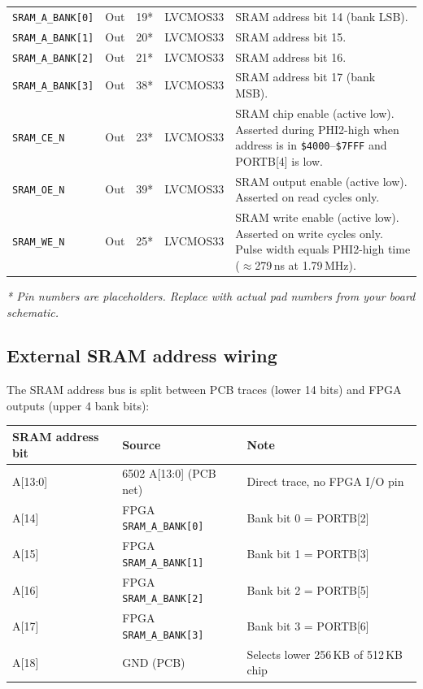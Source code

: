 \documentclass[11pt,a4paper]{article}
\newcommand{\sig}[1]{\texttt{#1}}
\newcommand{\hex}[1]{\texttt{\$#1}}
\begin{document}
\begin{center}
\begin{longtable}{llllp{5.5cm}}
\sig{SRAM\_A\_BANK[0]} & Out & 19* & LVCMOS33 &
    SRAM address bit 14 (bank LSB). \\
\sig{SRAM\_A\_BANK[1]} & Out & 20* & LVCMOS33 &
    SRAM address bit 15. \\
\sig{SRAM\_A\_BANK[2]} & Out & 21* & LVCMOS33 &
    SRAM address bit 16. \\
\sig{SRAM\_A\_BANK[3]} & Out & 38* & LVCMOS33 &
    SRAM address bit 17 (bank MSB). \\
\sig{SRAM\_CE\_N}   & Out   & 23* & LVCMOS33 &
    SRAM chip enable (active low). Asserted during PHI2-high when
    address is in \hex{4000}--\hex{7FFF} and PORTB[4] is low. \\
\sig{SRAM\_OE\_N}   & Out   & 39* & LVCMOS33 &
    SRAM output enable (active low). Asserted on read cycles only. \\
\sig{SRAM\_WE\_N}   & Out   & 25* & LVCMOS33 &
    SRAM write enable (active low). Asserted on write cycles only.
    Pulse width equals PHI2-high time ($\approx$279\,ns at 1.79\,MHz). \\

\end{longtable}
\end{center}

\textit{* Pin numbers are placeholders.  Replace with actual pad numbers
from your board schematic.}

\subsection{External SRAM address wiring}

The SRAM address bus is split between PCB traces (lower 14 bits) and
FPGA outputs (upper 4 bank bits):

\begin{center}
\begin{tabular}{lll}
\toprule
\textbf{SRAM address bit} & \textbf{Source} & \textbf{Note} \\
\midrule
A[13:0]  & 6502 A[13:0] (PCB net) & Direct trace, no FPGA I/O pin \\
A[14]    & FPGA \sig{SRAM\_A\_BANK[0]} & Bank bit 0 = PORTB[2] \\
A[15]    & FPGA \sig{SRAM\_A\_BANK[1]} & Bank bit 1 = PORTB[3] \\
A[16]    & FPGA \sig{SRAM\_A\_BANK[2]} & Bank bit 2 = PORTB[5] \\
A[17]    & FPGA \sig{SRAM\_A\_BANK[3]} & Bank bit 3 = PORTB[6] \\
A[18]    & GND (PCB)               & Selects lower 256\,KB of 512\,KB chip \\
\bottomrule
\end{tabular}
\end{center}
\end{document}
